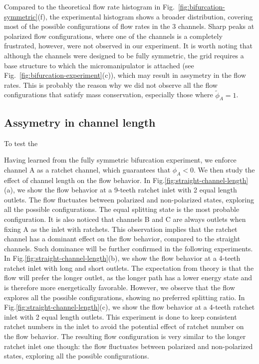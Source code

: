 \documentclass[%
10pt,
superscriptaddress,
twocolumn,
 amsmath,amssymb,
 aps,prx,
]{revtex4-2}
\begin{document}
Compared to the theoretical flow rate histogram in Fig.~\ref{fig:bifurcation-symmetric}(f), the experimental histogram shows a broader distribution, covering most of the possible configurations of flow rates in the 3 channels.
Sharp peaks at polarized flow configurations, where one of the channels is a completely frustrated, however, were not observed in our experiment. 
It is worth noting that although the channels were designed to be fully symmetric, the grid requires a base structure to which the micromanipulator is attached (see Fig.~\ref{fig:bifurcation-experiment}(c)), which may result in assymetry in the flow rates.
This is probably the reason why we did not observe all the flow configurations that satisfy mass conservation, especially those where $\tilde\phi_A=1$.

\subsection{Assymetry in channel length}

To test the 

Having learned from the fully symmetric bifurcation experiment, we enforce channel A as a ratchet channel, which guarantees that $\phi_A<0$.
We then study the effect of channel length on the flow behavior.
In Fig.\ref{fig:straight-channel-length}(a), we show the flow behavior at a 9-teeth ratchet inlet with 2 equal length outlets.
The flow fluctuates between polarized and non-polarized states, exploring all the possible configurations.
The equal splitting state is the most probable configuration.
It is also noticed that channels B and C are always outlets when fixing A as the inlet with ratchets.
This observation implies that the ratchet channel has a dominant effect on the flow behavior, compared to the straight channels.
Such dominance will be further confirmed in the following experiments.
In Fig.\ref{fig:straight-channel-length}(b), we show the flow behavior at a 4-teeth ratchet inlet with long and short outlets.
The expectation from theory is that the flow will prefer the longer outlet, as the longer path has a lower energy state and is therefore more energetically favorable.
However, we observe that the flow explores all the possible configurations, showing no preferred splitting ratio.
In Fig.\ref{fig:straight-channel-length}(c), we show the flow behavior at a 4-teeth ratchet inlet with 2 equal length outlets.
This experiment is done to keep consistent ratchet numbers in the inlet to avoid the potential effect of ratchet number on the flow behavior.
The resulting flow configuration is very similar to the longer ratchet inlet one though: the flow fluctuates between polarized and non-polarized states, exploring all the possible configurations.
\end{document}

